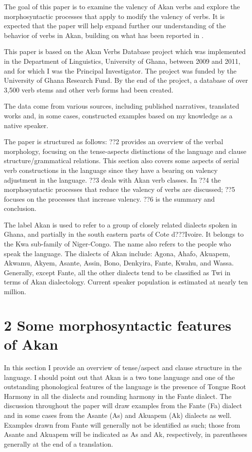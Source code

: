 \documentclass[output=paper]{langsci/langscibook}
\begin{document}
The goal of this paper is to examine the valency of Akan verbs and explore the morphosyntactic processes that apply to modify the valency of verbs. It is expected that the paper will help expand further our understanding of the behavior of verbs in Akan, building on what has been reported in \citet{Osam2008a}. 

This paper is based on the Akan Verbs Database project which was implemented in the Department of Linguistics, University of Ghana, between 2009 and 2011, and for which I was the Principal Investigator. The project was funded by the University of Ghana Research Fund. By the end of the project, a database of over 3,500 verb stems and other verb forms had been created.

The data come from various sources, including published narratives, translated works and, in some cases, constructed examples based on my knowledge as a native speaker.

The paper is structured as follows: ??2 provides an overview of the verbal morphology, focusing on the tense-aspects distinctions of the language and clause structure/grammatical relations. This section also covers some aspects of serial verb constructions in the language since they have a bearing on valency adjustment in the language. ??3 deals with Akan verb classes. In ??4 the morphosyntactic processes that reduce the valency of verbs are discussed; ??5 focuses on the processes that increase valency. ??6 is the summary and conclusion.

The label Akan is used to refer to a group of closely related dialects spoken in Ghana, and partially in the south eastern parts of Cote d???Ivoire. It belongs to the Kwa sub-family of Niger-Congo. The name also refers to the people who speak the language. The dialects of Akan include: Agona, Ahafo, Akuapem, Akwamu, Akyem, Asante, Assin, Bono, Denkyira, Fante, Kwahu, and Wassa. Generally, except Fante, all the other dialects tend to be classified as Twi in terms of Akan dialectology. Current speaker population is estimated at nearly ten million.

\chapter[2  Some morphosyntactic features of Akan]{2  Some morphosyntactic features of Akan}
\begin{styleBodyTextIndent}
In this section I provide an overview of tense/aspect and clause structure in the language. I should point out that Akan is a two tone language and one of the outstanding phonological features of the language is the presence of Tongue Root Harmony in all the dialects and rounding harmony in the Fante dialect. The discussion throughout the paper will draw examples from the Fante (Fa) dialect and in some cases from the Asante (As) and Akuapem (Ak) dialects as well. Examples drawn from Fante will generally not be identified as such; those from Asante and Akuapem will be indicated as As and Ak, respectively, in parentheses generally at the end of a translation.
\end{styleBodyTextIndent}
\end{document}
